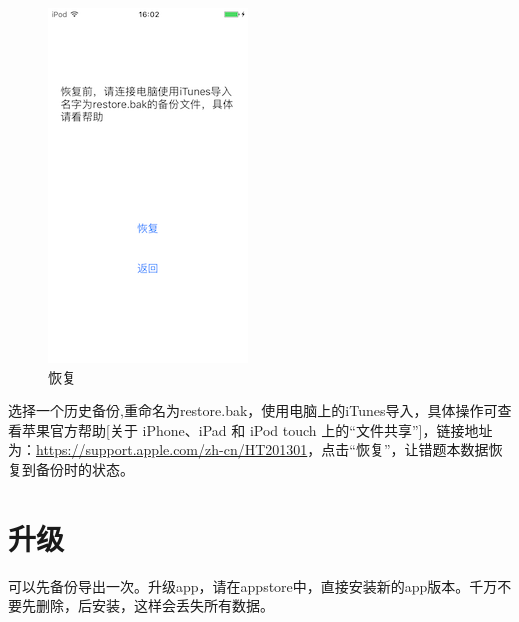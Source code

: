 \begin{figure}[H]
	\centering
	\includegraphics{img/2.png}
	\caption{恢复}
	\label{img2}
\end{figure}

选择一个历史备份,重命名为restore.bak，使用电脑上的iTunes导入，具体操作可查看苹果官方帮助[关于 iPhone、iPad 和 iPod touch 上的“文件共享”]，链接地址为：\url{https://support.apple.com/zh-cn/HT201301}，点击“恢复”，让错题本数据恢复到备份时的状态。
\section{升级}
可以先备份导出一次。升级app，请在appstore中，直接安装新的app版本。千万不要先删除，后安装，这样会丢失所有数据。